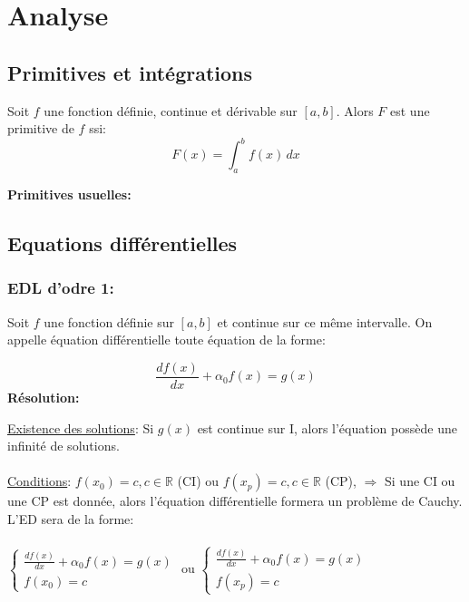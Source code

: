 \section{Analyse}
\subsection{Primitives et intégrations}

Soit $f$ une fonction définie, continue et dérivable sur $[a,b]$. Alors $F$ est une primitive de $f$ ssi:
$$
    F(x) =  \int_{a}^{b} f(x) \,dx 
$$

\textbf{Primitives usuelles:} 

\subsection{Equations différentielles}

\subsubsection{EDL d'odre 1:}

Soit $f$ une fonction définie sur $[a, b]$ et continue sur ce même intervalle. On appelle équation différentielle toute équation de la forme:

$$
    \frac{df(x)}{dx} + \alpha_0 f(x) = g(x)
$$
\textbf{Résolution:}

\underline{Existence des solutions}: Si $g(x)$ est continue sur I, alors l'équation possède une infinité de solutions.\\
\\
\underline{Conditions}:  $f(x_0)=c, c\in \mathbb{R}$ (CI) ou $f(x_p) = c, c\in \mathbb{R}$ (CP), $\Rightarrow $ Si une CI ou une CP est donnée, alors l'équation différentielle formera un problème de Cauchy.\\
L'ED sera de la forme:\\
\\
$
\left\{
    \begin{array}{ll}
        \frac{df(x)}{dx} +
            \alpha_0 f(x) = g(x) \\
        f(x_0) = c
    \end{array}
\right.
$
ou
 $
\left\{
    \begin{array}{ll}
        \frac{df(x)}{dx} + \alpha_0 f(x) = g(x) \\
        f(x_p) = c
    \end{array}
\right.
$
\\

